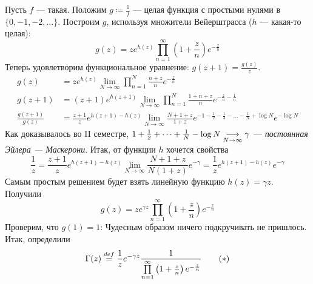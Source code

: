\documentclass[a4paper]{report}
\begin{document}
    Пусть $f$ --- такая.
    Положим $g \coloneqq \frac{1}{f}$ --- целая функция с простыми нулями в $\{0, -1, -2, \dots\}$.
    Построим $g$, используя множители Вейерштрасса ($h$ --- какая-то целая):
    \[g(z) = z e^{h(z)} \prod\limits_{n = 1}^{\infty}\left(1 + \frac{z}{n}\right)e^{-\frac{z}{n}}\]
    Теперь удовлетворим функциональное уравнение: $g(z + 1) = \frac{g(z)}{z}$.
    \begin{align*}g(z) &= z e^{h(z)}\lim\limits_{N \to \infty}\prod\limits_{n = 1}^{N}\frac{n + z}{n}e^{-\frac{z}{n}}\\
    g(z + 1) &= (z + 1)e^{h(z + 1)}\lim\limits_{N \to \infty}\prod\limits_{n = 1}^{N}\frac{1 + n + z}{n}e^{-\frac{z}{n} - \frac{1}{n}}\\
    \frac{g(z + 1)}{g(z)} &= \frac{z + 1}{z}e^{h(z + 1) - h(z)}\lim\limits_{N \to \infty}\frac{N + 1 + z}{1 + z}e^{-1 - \frac{1}{2} - \frac{1}{3} - \dots - \frac{1}{N} + \log N}e^{-\log N}\end{align*}
    Как доказывалось во II семестре, $1 + \frac{1}{2} + \dots + \frac{1}{N} - \log N \underset{N \to \infty}{\longrightarrow} \gamma$ --- \emph{постоянная Эйлера --- Маскерони}.
    Итак, от функции $h$ хочется свойства
    \[\frac 1z = \frac{z + 1}{z} e^{h(z + 1) - h(z)} \lim\limits_{N \to \infty} \frac{N + 1 + z}{N(1 + z)} e^{-\gamma} = \frac{1}{z}e^{h(z + 1) - h(z)}e^{-\gamma}\]
    Самым простым решением будет взять линейную функцию $h(z) = \gamma z$.
    Получили
    \[g(z) = z e^{\gamma z}\prod\limits_{n = 1}^{\infty}\left(1 + \frac{z}{n}\right)e^{-\frac{z}{n}}\]
    Проверим, что $g(1) = 1$:
    Чудесным образом ничего подкручивать не пришлось.
    Итак, определили
    \[\Gamma(z) \overset{def}{=} \frac{1}{z}e^{-\gamma z} \frac{1}{\prod\limits_{n = 1}^{\infty}\left(1 + \frac{z}{n}\right)e^{-\frac{z}{n}}}\tag{$*$}\label{gamma-def}\]
\end{document}
